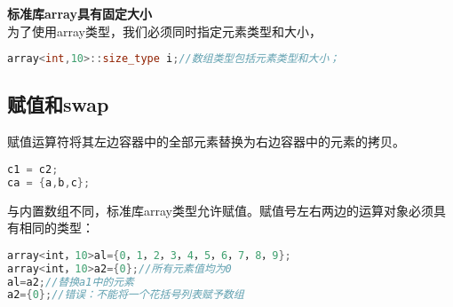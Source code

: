 \documentclass[
  a4paper,
  oneside,tablecaptionabove
]{scrbook}
\begin{document}
\textbf{标准库array具有固定大小}\\
为了使用array类型，我们必须同时指定元素类型和大小，

\begin{lstlisting}[language={C++}]
array<int,10>::size_type i;//数组类型包括元素类型和大小；
\end{lstlisting}

\subsection{赋值和swap}\label{ux8d4bux503cux548cswap}

赋值运算符将其左边容器中的全部元素替换为右边容器中的元素的拷贝。

\begin{lstlisting}[language={C++}]
c1 = c2;
ca = {a,b,c};
\end{lstlisting}

与内置数组不同，标准库array类型允许赋值。赋值号左右两边的运算对象必须具有相同的类型：

\begin{lstlisting}[language={C++}]
array<int，10>al={0，1，2，3，4，5，6，7，8，9};
array<int，10>a2={0};//所有元素值均为0
al=a2;//替换a1中的元素
a2={0};//错误：不能将一个花括号列表赋予数组
\end{lstlisting}
\end{document}
